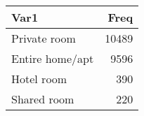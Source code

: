 \begin{table}[H]
\centering
\begin{tabular}[t]{lr}
\toprule
Var1 & Freq\\
\midrule
Private room & 10489\\
Entire home/apt & 9596\\
Hotel room & 390\\
Shared room & 220\\
\bottomrule
\end{tabular}
\end{table}